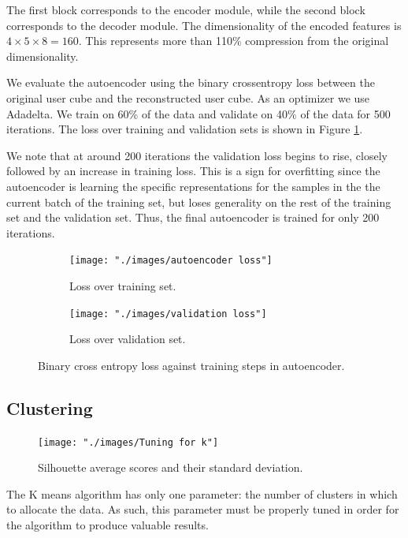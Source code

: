 \documentclass{article}
\begin{document}
The first block corresponds to the encoder module, while the second block corresponds to the decoder module. The dimensionality of the encoded features is $4 \times 5 \times 8 = 160$. This represents more than 110\% compression from the original dimensionality. 

We evaluate the autoencoder using the binary crossentropy loss between the original user cube and the reconstructed user cube. As an optimizer we use Adadelta. We train on 60\% of the data and validate on 40\% of the data for 500 iterations. The loss over training and validation sets is shown in Figure \ref{fig:clustering/loss}.

We note that at around 200 iterations the validation loss begins to rise, closely followed by an increase in training loss. This is a sign for overfitting since the autoencoder is learning the specific representations for the samples in the the current batch of the training set, but loses generality on the rest of the training set and the validation set. Thus, the final autoencoder is trained for only 200 iterations.

\begin{figure}[H]
  \centering
  \begin{subfigure}[b]{.9\textwidth}
  	\centering
	\texttt{[image: "./images/autoencoder loss"]}
  \caption{Loss over training set.}
  \end{subfigure}
  \begin{subfigure}[b]{.9\textwidth}
  	\centering
	\texttt{[image: "./images/validation loss"]}
  \caption{Loss over validation set.}
  \end{subfigure}
  \caption{Binary cross entropy loss against training steps in autoencoder.}
  	\label{fig:clustering/loss} 
\end{figure}

\subsection{Clustering}

\begin{figure}[H]
  \centering
  \texttt{[image: "./images/Tuning for k"]}
  \caption{Silhouette average scores and their standard deviation.}
  \label{fig:clustering/tuning}
\end{figure}

The K means algorithm has only one parameter: the number of clusters in which to allocate the data. As such, this parameter must be properly tuned in order for the algorithm to produce valuable results. 
\end{document}
